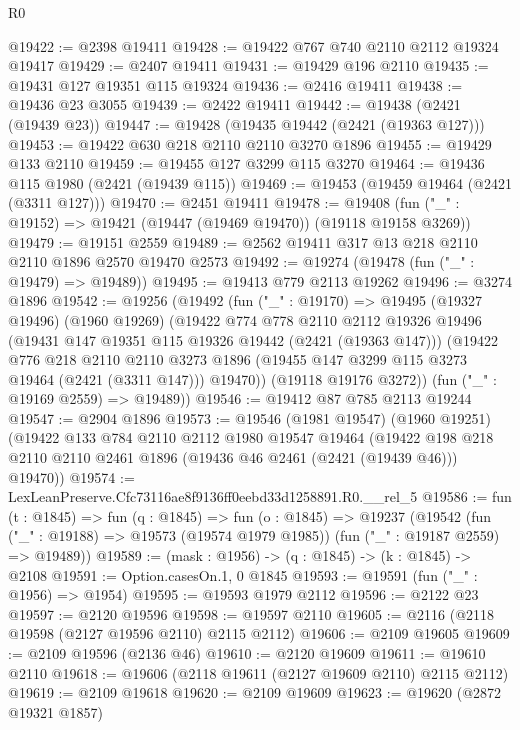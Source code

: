 \begin{lexlean}{R0}
\begin{coremodule}
@19422 := @2398 @19411
@19428 := @19422 @767 @740 @2110 @2112 @19324 @19417
@19429 := @2407 @19411
@19431 := @19429 @196 @2110
@19435 := @19431 @127 @19351 @115 @19324
@19436 := @2416 @19411
@19438 := @19436 @23 @3055
@19439 := @2422 @19411
@19442 := @19438 (@2421 (@19439 @23))
@19447 := @19428 (@19435 @19442 (@2421 (@19363 @127)))
@19453 := @19422 @630 @218 @2110 @2110 @3270 @1896
@19455 := @19429 @133 @2110
@19459 := @19455 @127 @3299 @115 @3270
@19464 := @19436 @115 @1980 (@2421 (@19439 @115))
@19469 := @19453 (@19459 @19464 (@2421 (@3311 @127)))
@19470 := @2451 @19411
@19478 := @19408 (fun ("_" : @19152) => @19421 (@19447 (@19469 @19470)) (@19118 @19158 @3269))
@19479 := @19151 @2559
@19489 := @2562 @19411 @317 @13 @218 @2110 @2110 @1896 @2570 @19470 @2573
@19492 := @19274 (@19478 (fun ("_" : @19479) => @19489))
@19495 := @19413 @779 @2113 @19262
@19496 := @3274 @1896
@19542 := @19256
    (@19492
      (fun ("_" : @19170) =>
      @19495
        (@19327 @19496)
        (@1960 @19269)
        (@19422
          @774
          @778
          @2110
          @2112
          @19326
          @19496
          (@19431 @147 @19351 @115 @19326 @19442 (@2421 (@19363 @147)))
          (@19422
            @776
            @218
            @2110
            @2110
            @3273
            @1896
            (@19455 @147 @3299 @115 @3273 @19464 (@2421 (@3311 @147)))
            @19470))
        (@19118 @19176 @3272))
      (fun ("_" : @19169 @2559) => @19489))
@19546 := @19412 @87 @785 @2113 @19244
@19547 := @2904 @1896
@19573 := @19546
    (@1981 @19547)
    (@1960 @19251)
    (@19422
      @133
      @784
      @2110
      @2112
      @1980
      @19547
      @19464
      (@19422 @198 @218 @2110 @2110 @2461 @1896 (@19436 @46 @2461 (@2421 (@19439 @46))) @19470))
@19574 := LexLeanPreserve.Cfc73116ae8f9136ff0eebd33d1258891.R0.__rel_5
@19586 := fun (t : @1845) =>
  fun (q : @1845) =>
  fun (o : @1845) =>
  @19237
    (@19542
      (fun ("_" : @19188) => @19573 (@19574 @1979 @1985))
      (fun ("_" : @19187 @2559) => @19489))
@19589 := (mask : @1956) -> (q : @1845) -> (k : @1845) -> @2108
@19591 := Option.casesOn.{1, 0} @1845
@19593 := @19591 (fun ("_" : @1956) => @1954)
@19595 := @19593 @1979 @2112
@19596 := @2122 @23
@19597 := @2120 @19596
@19598 := @19597 @2110
@19605 := @2116 (@2118 @19598 (@2127 @19596 @2110) @2115 @2112)
@19606 := @2109 @19605
@19609 := @2109 @19596 (@2136 @46)
@19610 := @2120 @19609
@19611 := @19610 @2110
@19618 := @19606 (@2118 @19611 (@2127 @19609 @2110) @2115 @2112)
@19619 := @2109 @19618
@19620 := @2109 @19609
@19623 := @19620 (@2872 @19321 @1857)

\end{coremodule}
\end{lexlean}
